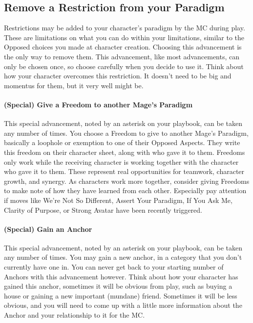 \documentclass[
]{article}
\begin{document}
\hypertarget{remove-a-restriction-from-your-paradigm}{%
\subsection{Remove a Restriction from your
Paradigm}\label{remove-a-restriction-from-your-paradigm}}

Restrictions may be added to your character's paradigm by the MC during
play. These are limitations on what you can do within your limitations,
similar to the Opposed choices you made at character creation. Choosing
this advancement is the only way to remove them. This advancement, like
most advancements, can only be chosen once, so choose carefully when you
decide to use it. Think about how your character overcomes this
restriction. It doesn't need to be big and momentus for them, but it
very well might be.

\hypertarget{special-give-a-freedom-to-another-mages-paradigm}{%
\paragraph{(Special) Give a Freedom to another Mage's
Paradigm}\label{special-give-a-freedom-to-another-mages-paradigm}}

This special advancement, noted by an asterisk on your playbook, can be
taken any number of times. You choose a Freedom to give to another
Mage's Paradigm, basically a loophole or exemption to one of their
Opposed Aspects. They write this freedom on their character sheet, along
with who gave it to them. Freedoms only work while the receiving
character is working together with the character who gave it to them.
These represent real opportunities for teamwork, character growth, and
synergy. As characters work more together, consider giving Freedoms to
make note of how they have learned from each other. Especially pay
attention if moves like We're Not So Different, Assert Your Paradigm, If
You Ask Me, Clarity of Purpose, or Strong Avatar have been recently
triggered.

\hypertarget{special-gain-an-anchor}{%
\paragraph{(Special) Gain an Anchor}\label{special-gain-an-anchor}}

This special advancement, noted by an asterisk on your playbook, can be
taken any number of times. You may gain a new anchor, in a category that
you don't currently have one in. You can never get back to your starting
number of Anchors with this advancement however. Think about how your
character has gained this anchor, sometimes it will be obvious from
play, such as buying a house or gaining a new important (mundane)
friend. Sometimes it will be less obvious, and you will need to come up
with a little more information about the Anchor and your relationship to
it for the MC.
\end{document}
